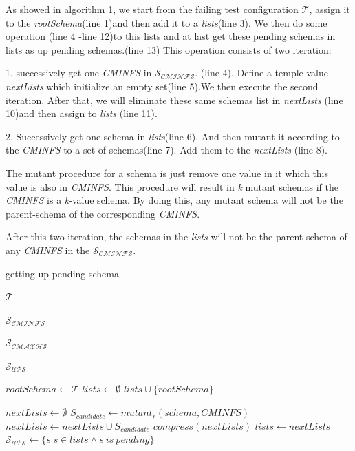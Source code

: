 \documentclass[10pt,journal,cspaper,compsoc]{IEEEtran}
\begin{document}
As showed in algorithm 1, we start from the failing test configuration $\mathcal{T}$, assign it to the \emph{rootSchema}(line 1)and then add it to a \emph{lists}(line 3). We then do some operation (line 4 -line 12)to this lists and at last get these pending schemas in lists as up pending schemas.(line 13)  This operation consists of two iteration:

1. successively get one \emph{CMINFS} in $\mathcal{S_{CMINFS}}$. (line 4). Define a temple value \emph{nextLists} which initialize an empty set(line 5).We then execute the second iteration. After that, we will eliminate these same schemas list in \emph{nextLists} (line 10)and then assign to \emph{lists} (line 11).

2. Successively get one schema in \emph{lists}(line 6). And then mutant it according to the \emph{CMINFS} to a set of schemas(line 7). Add them to the  \emph{nextLists} (line 8).

The mutant procedure for a schema is just remove one value in it which this value is also in \emph{CMINFS}. This procedure will result in \emph{k} mutant schemas if the \emph{CMINFS} is a \emph{k}-value schema. By doing this, any mutant schema will not be the parent-schema of the corresponding \emph{CMINFS}.

After this two iteration, the schemas in the \emph{lists} will not be the parent-schema of any \emph{CMINFS} in the $\mathcal{S_{CMINFS}}$.

\begin{algorithm}
  \caption{getting up pending schema}
  \begin{algorithmic}[1]
     \Require  $\mathcal{T}$ 

     $\mathcal{S_{CMINFS}}$ 

     $\mathcal{S_{CMAXHS}}$ 

     \Ensure  $\mathcal{S_{UPS}}$ 

    \Statex{}
    \State $rootSchema \leftarrow \mathcal{T}$
    \State $lists \leftarrow \emptyset$
    \State $lists \cup \{rootSchema\}$

     \State $nextLists \leftarrow \emptyset$
        \State$S_{candidate} \leftarrow mutant_{r}(schema,CMINFS)$
        \State $nextLists \leftarrow nextLists \cup S_{candidate}$
     \EndFor
     \State $compress(nextLists)$
     \State $lists \leftarrow nextLists$
    \EndFor
     \State $\mathcal{S_{UPS}} \leftarrow   \{ s | s \in lists \wedge {s\ is\ pending}\}$
  \end{algorithmic}
\end{algorithm}
\end{document}
